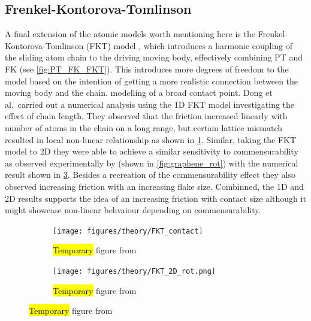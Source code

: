 \subsection{Frenkel-Kontorova-Tomlinson}
A final extension of the atomic models worth mentioning here is the
Frenkel-Kontorova-Tomlinson (\acrshort{FKT}) model \cite{weiss_dry_1997}, which
introduces a harmonic coupling of the sliding atom chain to the driving moving
body, effectively combining \acrshort{PT} and \acrshort{FK} (see \cref{fig:PT_FK_FKT}). This introduces
more degrees of freedom to the model based on the intention of getting a more realistic connection between the moving body and the chain. 
modelling of a broad contact point. Dong et al.\ carried out a numerical
analysis using the 1D \acrshort{FKT} model investigating the effect of chain
length. They observed that the friction increased linearly with number of atoms
in the chain on a long range, but certain lattice mismatch resulted in local non-linear relationship as shown in \cref{fig:FKT_contact}. Similar, taking the
\acrshort{FKT} model to 2D they were able to achieve a similar sensitivity to
commensurability as observed experimentally by \cite{DIENWIEBEL2005197} (shown in
\cref{fig:graphene_rot}) with the numerical result shown in \cref{fig:FKT_2D_rot}. Besides a recreation of the commensurability effect they also observed increasing friction with an increasing flake size. Combinned, the 1D and 2D results supports the idea of an increasing friction with contact size although it might showcase non-linear behvaiour depending on commensurability.


\begin{figure}[H]
  \centering
  \begin{subfigure}[t]{0.49\textwidth}
      \centering
      \texttt{[image: figures/theory/FKT\_contact]}
      \label{fig:FKT_contact}
      \caption{\hl{Temporary} figure from \cite{Yalin_2011} }
  \end{subfigure}
  \hfill
  \begin{subfigure}[t]{0.49\textwidth}
      \centering
      \texttt{[image: figures/theory/FKT\_2D\_rot.png]}
      \label{fig:FKT_2D_rot}
      \caption{\hl{Temporary} figure from \cite{Yalin_2011} }
  \end{subfigure}
  \hfill
\end{figure}





